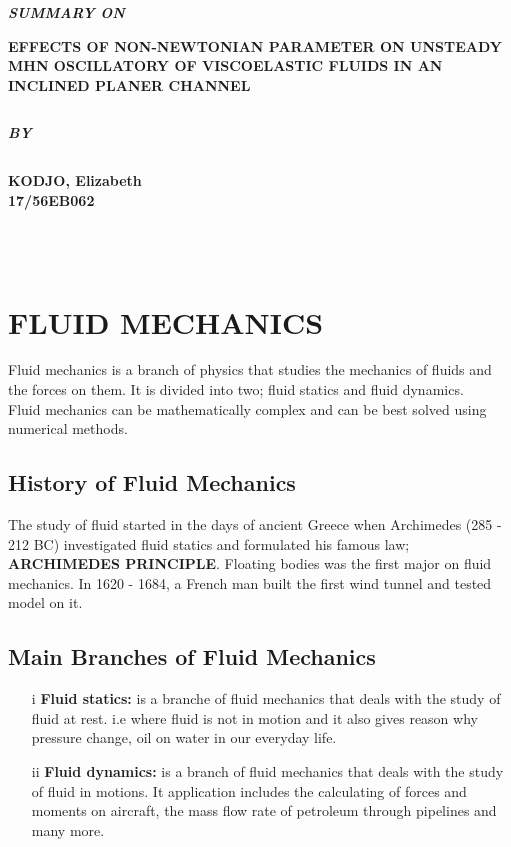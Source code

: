 \documentclass[12pt]{report}
\newcommand{\bt}[1]{\textbf{#1}}
\newcommand{\sps}{\\[0.2cm]}
\begin{document}
	\clearpage
	\thispagestyle{empty}
	\begin{center}
		\textbf{\itshape SUMMARY ON}
	\end{center} 
	\begin{center}
		{\bf \Large EFFECTS OF NON-NEWTONIAN PARAMETER ON UNSTEADY MHN OSCILLATORY OF VISCOELASTIC FLUIDS IN AN INCLINED PLANER CHANNEL}
	\end{center}
	$$$$
	\vspace{3cm}
	\begin{center}
		\textbf{\itshape BY}
	\end{center} 
	$$$$
	\vspace{2cm}
	\begin{center}
		{\bf KODJO, Elizabeth\\
			17/56EB062}
	\end{center}
	$$$$
	\\ \\
	\newpage
	
	\chapter{FLUID MECHANICS}
	Fluid mechanics is a branch of physics that studies the mechanics of fluids and the forces on them. It is divided into two; fluid statics and fluid dynamics.\sps
	Fluid mechanics can be mathematically complex and can be best solved using numerical methods.
	
	\section{History of Fluid Mechanics}
	The study of fluid started in the days of ancient Greece when Archimedes (285 - 212 BC) investigated fluid statics and formulated his famous law; \bt{ARCHIMEDES PRINCIPLE}. Floating bodies was the first major on fluid mechanics. In 1620 - 1684, a French man built the first wind tunnel and tested model on it.
	
	\section{Main Branches of Fluid Mechanics}
	\begin{enumerate}
		\item [i] \bt{Fluid statics:} is a branche of fluid mechanics that deals with the study of fluid at rest. i.e where fluid is not in motion and it also gives reason why pressure change, oil on water in our everyday life.
		
		\item [ii] \bt{Fluid dynamics:} is a branch of fluid mechanics that deals with the study of fluid in motions. It application includes the calculating of forces and moments on aircraft, the mass flow rate of petroleum through pipelines and many more.
	\end{enumerate}
\end{document}
